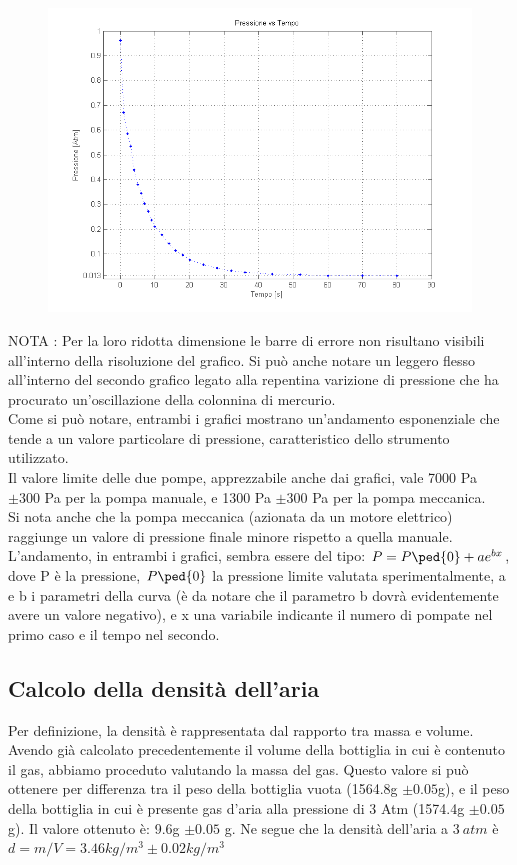 \documentclass[a4paper,11pt]{article}
\begin{document}
\begin{figure}[htbp]
\centering
\includegraphics[width=15cm]{grafico_Pt.png}
\end{figure}


NOTA : Per la loro ridotta dimensione le barre di errore non risultano visibili all'interno della risoluzione del grafico. Si può anche notare un leggero flesso all'interno del secondo grafico legato alla repentina varizione di pressione che ha procurato un'oscillazione della colonnina di mercurio.\\


Come si può notare, entrambi i grafici mostrano un'andamento esponenziale che tende a un valore particolare di pressione, caratteristico dello strumento utilizzato. \\
Il valore limite delle due pompe, apprezzabile anche dai grafici, vale 7000 Pa $\pm 300$ Pa per la pompa manuale, e 1300 Pa $\pm 300$ Pa per la pompa meccanica.\\
Si nota anche che la pompa meccanica (azionata da un motore elettrico) raggiunge un valore di pressione finale minore rispetto a quella manuale.
L'andamento, in entrambi i grafici, sembra essere del tipo: $P=P\ped{0}+ae^{bx}$, dove P è la pressione, $P\ped{0}$ la pressione limite valutata sperimentalmente, a e b i parametri della curva (è da notare che il parametro b dovrà evidentemente avere un valore negativo), e x una variabile indicante il numero di pompate nel primo caso e il tempo nel secondo.


\subsection{Calcolo della densità dell'aria}
Per definizione, la densità è rappresentata dal rapporto tra massa e volume. Avendo già calcolato precedentemente il volume della bottiglia in cui è contenuto il gas, abbiamo proceduto valutando la massa del gas. Questo valore si può ottenere per differenza tra il peso della bottiglia vuota (1564.8g $\pm 0.05$g), e il peso della bottiglia in cui è presente gas d'aria alla pressione di 3 Atm (1574.4g $\pm 0.05$g). Il valore ottenuto è: 9.6g $\pm 0.05$ g.
Ne segue che la densità dell'aria a $3 ~atm$ è  $d= m/V= 3.46 kg/m^3 \pm 0.02kg/m^3$  
\end{document}
